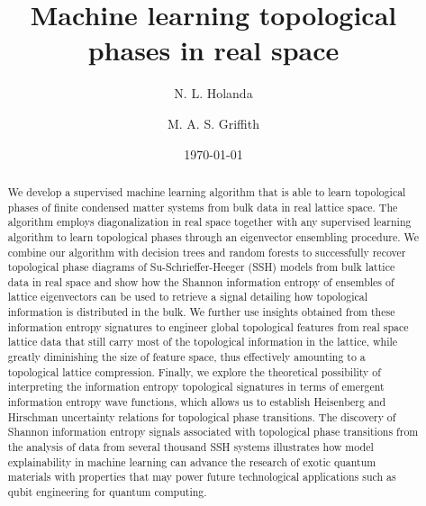 \documentclass[10pt]{revtex4-1}
\begin{document}
\nocite{*}

\title{Machine learning topological phases in real space}

\author{N. L. Holanda}

\author{M. A. S. Griffith}

\date{\today }

\begin{abstract}
We develop a supervised machine learning algorithm that is able to learn topological phases of finite condensed matter systems from bulk data in real lattice space. The algorithm employs diagonalization in real space together with any supervised learning algorithm to learn topological phases through an eigenvector ensembling procedure. We combine our algorithm with decision trees and random forests to successfully recover topological phase diagrams of Su-Schrieffer-Heeger (SSH) models from bulk lattice data in real space and show how the Shannon information entropy of ensembles of lattice eigenvectors can be used to retrieve a signal detailing how topological information is distributed in the bulk. We further use insights obtained from these information entropy signatures to engineer global topological features from real space lattice data that still carry most of the topological information in the lattice, while greatly diminishing the size of feature space, thus effectively amounting to a topological lattice compression. Finally, we explore the theoretical possibility of interpreting the information entropy topological signatures in terms of emergent information entropy wave functions, which allows us to establish Heisenberg and Hirschman uncertainty relations for topological phase transitions. The discovery of Shannon information entropy signals associated with topological phase transitions from the analysis of data from several thousand SSH systems illustrates how model explainability in machine learning can advance the research of exotic quantum materials with properties that may power future technological applications such as qubit engineering for quantum computing. 
\end{abstract}
\end{document}
